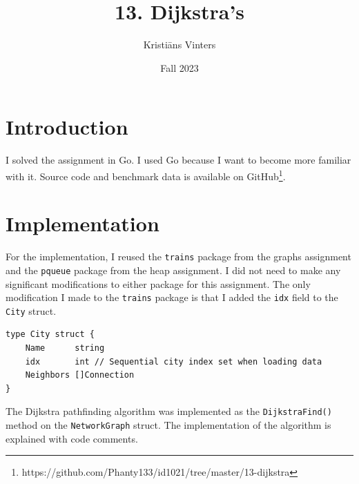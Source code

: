 \documentclass[a4paper,11pt]{article}
\title{\textbf{13. Dijkstra's}}
\author{Kristiāns Vinters}
\date{Fall 2023}
\begin{document}
    \maketitle
    \section*{Introduction}

    I solved the assignment in Go. I used Go because I want to become more familiar with it. Source code and benchmark data is available on GitHub\footnote{https://github.com/Phanty133/id1021/tree/master/13-dijkstra}.

    \section*{Implementation}

    For the implementation, I reused the \texttt{trains} package from the graphs assignment and the \texttt{pqueue} package from the heap assignment. I did not need to make any significant modifications to either package for this assignment. The only modification I made to the \texttt{trains} package is that I added the \texttt{idx} field to the \texttt{City} struct.

    \begin{verbatim}
type City struct {
    Name      string
    idx       int // Sequential city index set when loading data
    Neighbors []Connection
}
    \end{verbatim}

    The Dijkstra pathfinding algorithm was implemented as the \texttt{DijkstraFind()} method on the \texttt{NetworkGraph} struct. The implementation of the algorithm is explained with code comments.
\end{document}
